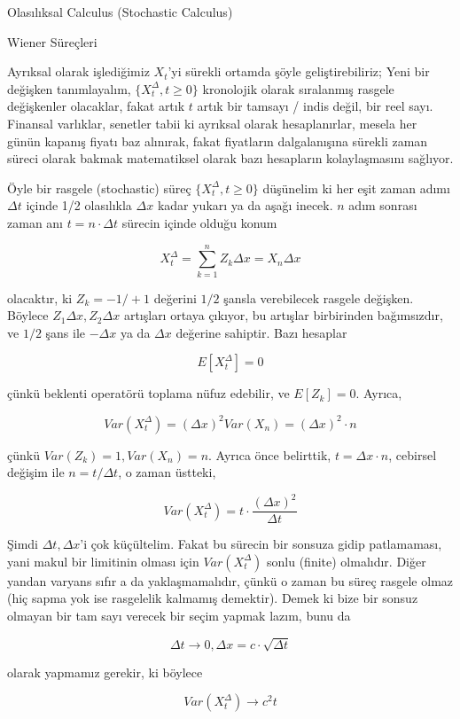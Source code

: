 \documentclass[12pt,fleqn]{article}\usepackage{../../common}
\begin{document}
Olasılıksal Calculus (Stochastic Calculus)

Wiener Süreçleri 

Ayrıksal olarak işlediğimiz $X_t$'yi sürekli ortamda şöyle geliştirebiliriz;
Yeni bir değişken tanımlayalım, $\{ X_t^{\Delta}, t \ge 0 \}$ kronolojik olarak
sıralanmış rasgele değişkenler olacaklar, fakat artık $t$ artık bir tamsayı /
indis değil, bir reel sayı. Finansal varlıklar, senetler tabii ki ayrıksal
olarak hesaplanırlar, mesela her günün kapanış fiyatı baz alınırak, fakat
fiyatların dalgalanışına sürekli zaman süreci olarak bakmak matematiksel olarak
bazı hesapların kolaylaşmasını sağlıyor.

Öyle bir rasgele (stochastic) süreç $\{ X_t^{\Delta}, t \ge 0 \}$ düşünelim ki
her eşit zaman adımı $\Delta t$ içinde 1/2 olasılıkla $\Delta x$ kadar yukarı ya
da aşağı inecek. $n$ adım sonrası zaman anı $t = n \cdot \Delta t$ sürecin
içinde olduğu konum

$$ X_t^{\Delta} = \sum _{k=1}^{n} Z_k \Delta x = X_n \Delta x $$

olacaktır, ki $Z_k = -1/+1$ değerini $1/2$ şansla verebilecek rasgele
değişken. Böylece $Z_1 \Delta x,Z_2 \Delta x$ artışları ortaya çıkıyor, bu
artışlar birbirinden bağımsızdır, ve $1/2$ şans ile $-\Delta x$ ya da $\Delta x$
değerine sahiptir. Bazı hesaplar

$$ E[X_t^{\Delta}] = 0 $$

çünkü beklenti operatörü toplama nüfuz edebilir, ve $E[Z_k] = 0$. Ayrıca,

$$ Var(X_t^{\Delta}) = (\Delta x)^2 Var(X_n) =  (\Delta x)^2 \cdot n$$

çünkü $Var(Z_k) = 1,Var(X_n)=n$. Ayrıca önce belirttik, $t = \Delta x \cdot n$,
cebirsel değişim ile $n = t / \Delta t$, o zaman üstteki,

$$ Var(X_t^{\Delta}) = t \cdot \frac{(\Delta x)^2}{\Delta t}  $$

Şimdi $\Delta t,\Delta x$'i çok küçültelim. Fakat bu sürecin bir sonsuza gidip
patlamaması, yani makul bir limitinin olması için $Var(X_t^{\Delta})$ sonlu
(finite) olmalıdır. Diğer yandan varyans sıfır a da yaklaşmamalıdır, çünkü o
zaman bu süreç rasgele olmaz (hiç sapma yok ise rasgelelik kalmamış
demektir). Demek ki bize bir sonsuz olmayan bir tam sayı verecek bir seçim
yapmak lazım, bunu da

$$\Delta t \to 0, \Delta x = c \cdot \sqrt{\Delta t}$$

olarak yapmamız gerekir, ki böylece 

$$Var(X_t^{\Delta}) \to c^2t$$ 
\end{document}
